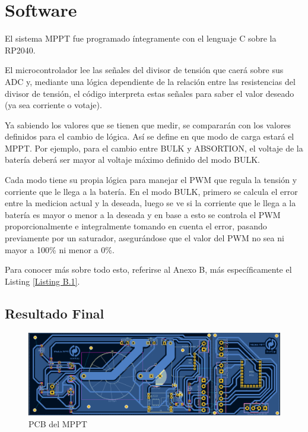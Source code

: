             \section{Software}
                El sistema MPPT fue programado íntegramente con el lenguaje C sobre la RP2040.\par
                El microcontrolador lee las señales del divisor de tensión que caerá sobre sus ADC y, mediante una lógica dependiente de la relación entre las resistencias del divisor de tensión, el código interpreta estas señales para saber el valor deseado (ya sea corriente o votaje).\par
                Ya sabiendo los valores que se tienen que medir, se compararán con los valores definidos para el cambio de lógica. Así se define en que modo de carga estará el MPPT. Por ejemplo, para el cambio entre BULK y ABSORTION, el voltaje de la batería deberá ser mayor al voltaje máximo definido del modo BULK.\par
                Cada modo tiene su propia lógica para manejar el PWM que regula la tensión y corriente que le llega a la batería. En el modo BULK, primero se calcula el error entre la medicion actual y la deseada, luego se ve si la corriente que le llega a la batería es mayor o menor a la deseada y en base a esto se controla el PWM proporcionalmente e integralmente tomando en cuenta el error, pasando previamente por un saturador, asegurándose que el valor del PWM no sea ni mayor a 100\% ni menor a 0\%.\par
                Para conocer más sobre todo esto, referirse al Anexo B, más específicamente el Listing \ref{Listing B.1}.
                
            \subsection{Resultado Final}
                \begin{figure}[H]
                    \centering
                    \includegraphics[width=0.8\linewidth]{MPPT/PCB - MPPT.png}
                    \caption{PCB del MPPT}
                    \label{fig:m5.1}
                \end{figure}